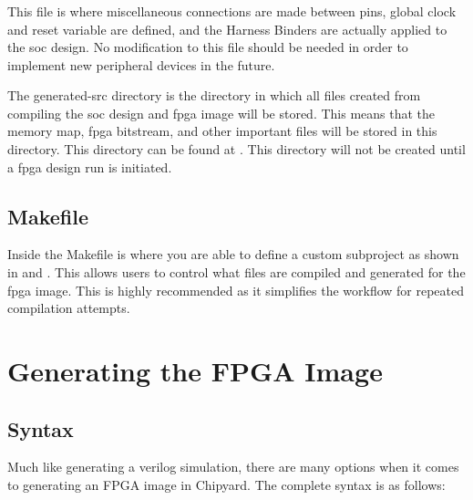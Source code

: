\subsubsection{}\label{sec:Customizing_FPGA-TestHarness.scala}
This file is where miscellaneous connections are made between pins, global clock and reset variable are defined, and the Harness Binders are actually applied to the \Gls{soc} design.
No modification to this file should be needed in order to implement new peripheral devices in the future.


The generated-src directory is the directory in which all files created from compiling the \Gls{soc} design and \Gls{fpga} image will be stored.
This means that the memory map, \Gls{fpga} bitstream, and other important files will be stored in this directory.
This directory can be found at .
This directory will not be created until a \Gls{fpga} design run is initiated.

\subsection{Makefile}\label{sec:Customizing_FPGA-Makefile}
Inside the Makefile is where you are able to define a custom subproject as shown in  and .
This allows users to control what files are compiled and generated for the \Gls{fpga} image.
This is highly recommended as it simplifies the workflow for repeated compilation attempts.

\section{Generating the FPGA Image}\label{sec:Generating_FPGA_Image}

\subsection{Syntax}\label{sec:Generating_FPGA_Image-Syntax}
Much like generating a verilog simulation, there are many options when it comes to generating an FPGA image in Chipyard.
The complete syntax is as follows:~\cite{Chipyard_Prototyping}

